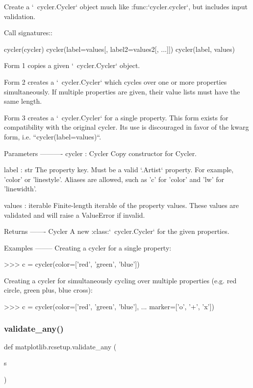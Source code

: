 \begin{DoxyVerb}Create a `~cycler.Cycler` object much like :func:`cycler.cycler`,
but includes input validation.

Call signatures::

  cycler(cycler)
  cycler(label=values[, label2=values2[, ...]])
  cycler(label, values)

Form 1 copies a given `~cycler.Cycler` object.

Form 2 creates a `~cycler.Cycler` which cycles over one or more
properties simultaneously. If multiple properties are given, their
value lists must have the same length.

Form 3 creates a `~cycler.Cycler` for a single property. This form
exists for compatibility with the original cycler. Its use is
discouraged in favor of the kwarg form, i.e. ``cycler(label=values)``.

Parameters
----------
cycler : Cycler
    Copy constructor for Cycler.

label : str
    The property key. Must be a valid `.Artist` property.
    For example, 'color' or 'linestyle'. Aliases are allowed,
    such as 'c' for 'color' and 'lw' for 'linewidth'.

values : iterable
    Finite-length iterable of the property values. These values
    are validated and will raise a ValueError if invalid.

Returns
-------
Cycler
    A new :class:`~cycler.Cycler` for the given properties.

Examples
--------
Creating a cycler for a single property:

>>> c = cycler(color=['red', 'green', 'blue'])

Creating a cycler for simultaneously cycling over multiple properties
(e.g. red circle, green plus, blue cross):

>>> c = cycler(color=['red', 'green', 'blue'],
...            marker=['o', '+', 'x'])\end{DoxyVerb}
 \mbox{\label{namespacematplotlib_1_1rcsetup_a2690931d36c48630e7d2cb03da5aed60}} 
\subsubsection{\texorpdfstring{validate\+\_\+any()}{validate\_any()}}
{\footnotesize\ttfamily def matplotlib.\+rcsetup.\+validate\+\_\+any (\begin{DoxyParamCaption}\item[{}]{s }\end{DoxyParamCaption})}

